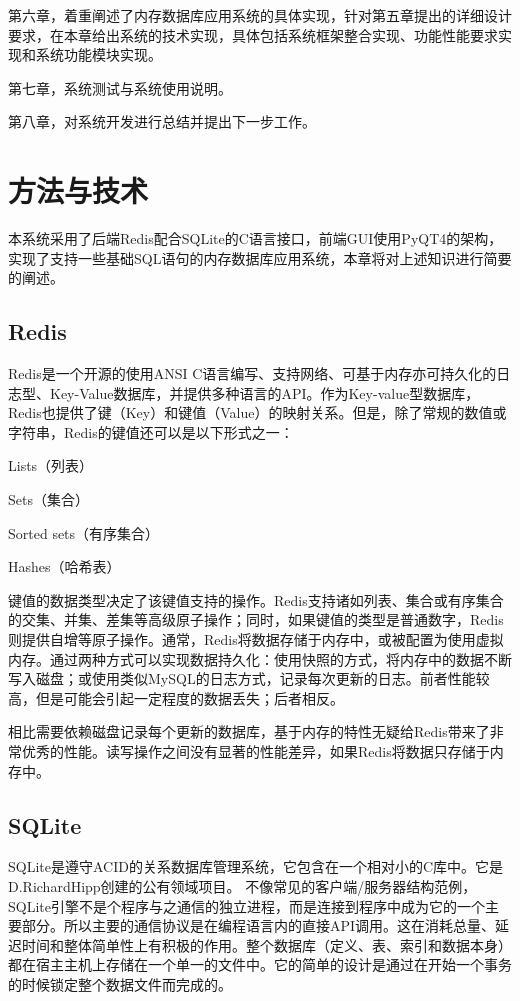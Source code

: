 \documentclass{zjutthesis}
\begin{document}
第六章，着重阐述了内存数据库应用系统的具体实现，针对第五章提出的详细设计要求，在本章给出系统的技术实现，具体包括系统框架整合实现、功能性能要求实现和系统功能模块实现。

第七章，系统测试与系统使用说明。

第八章，对系统开发进行总结并提出下一步工作。



\chapter{方法与技术}
本系统采用了后端Redis配合SQLite的C语言接口，前端GUI使用PyQT4的架构，实现了支持一些基础SQL语句的内存数据库应用系统，本章将对上述知识进行简要的阐述。

\section{Redis}
Redis是一个开源的使用ANSI C语言编写、支持网络、可基于内存亦可持久化的日志型、Key-Value数据库，并提供多种语言的API。作为Key-value型数据库，Redis也提供了键（Key）和键值（Value）的映射关系。但是，除了常规的数值或字符串，Redis的键值还可以是以下形式之一：

Lists（列表）

Sets（集合）

Sorted sets（有序集合）

Hashes（哈希表）

键值的数据类型决定了该键值支持的操作。Redis支持诸如列表、集合或有序集合的交集、并集、差集等高级原子操作；同时，如果键值的类型是普通数字，Redis则提供自增等原子操作。通常，Redis将数据存储于内存中，或被配置为使用虚拟内存。通过两种方式可以实现数据持久化：使用快照的方式，将内存中的数据不断写入磁盘；或使用类似MySQL的日志方式，记录每次更新的日志。前者性能较高，但是可能会引起一定程度的数据丢失；后者相反。

相比需要依赖磁盘记录每个更新的数据库，基于内存的特性无疑给Redis带来了非常优秀的性能。读写操作之间没有显著的性能差异，如果Redis将数据只存储于内存中。

\section{SQLite}
SQLite是遵守ACID的关系数据库管理系统，它包含在一个相对小的C库中。它是D.RichardHipp创建的公有领域项目。
不像常见的客户端/服务器结构范例，SQLite引擎不是个程序与之通信的独立进程，而是连接到程序中成为它的一个主要部分。所以主要的通信协议是在编程语言内的直接API调用。这在消耗总量、延迟时间和整体简单性上有积极的作用。整个数据库（定义、表、索引和数据本身）都在宿主主机上存储在一个单一的文件中。它的简单的设计是通过在开始一个事务的时候锁定整个数据文件而完成的。
\end{document}
